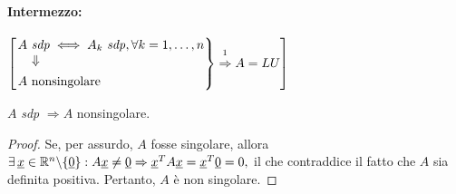 
\paragraph{Intermezzo:}{$\left[\begin{rcases}
    \Vrightarrow{A\text{ \textit{sdp}}}{}\iff A_k\text{ \textit{sdp}}, \forall k=1,\hdots,n\\
    A\text{ nonsingolare}
\end{rcases}\overset{\footnotemark}{\Rightarrow} A=LU\right]$}


\begin{theorem}\label{th:matrSDPNonSing}
    $A$ \textit{sdp} $\Rightarrow A$ nonsingolare.
\end{theorem}
\begin{proof}
    Se, per assurdo, $A$ fosse singolare, allora $\exists\, \uline x\in\mathbb R^n\backslash\{\uline 0\}: A\uline x\neq \uline 0 \Rightarrow \uline x^T A \uline x = \uline x^T\uline 0 = 0,$ il che contraddice il fatto che $A$ sia definita positiva. Pertanto, $A$ è non singolare.
\end{proof}

